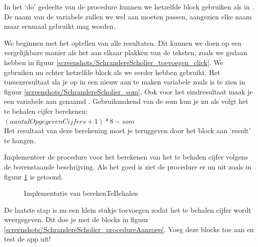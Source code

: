 In het `do' gedeelte van de procedure kunnen we hetzelfde  block gebruiken als in . De naam van de variabele zullen we wel aan moeten passen, aangezien elke naam maar eenmaal gebruikt mag worden. 

We beginnen met het optellen van alle resultaten. Dit kunnen we doen op een vergelijkbare manier als het aan elkaar plakken van de teksten, zoals we gedaan hebben in figuur \ref{screenshots/SchrandereScholier_toevoegen_click}. We gebruiken nu echter hetzelfde \block{+} block als we eerder hebben gebruikt. Het tussenresultaat sla je op in een nieuw aan te maken variabele zoals is te zien in figuur \ref{screenshots/SchrandereScholier_som}. Ook voor het eindresultaat maak je een variabele aan genaamd . Gebruikmakend van de som kun je nu als volgt het te behalen cijfer berekenen: \\$(aantalOpgegevenCijfers+1) * 8 - som$ \\Het resultaat van deze berekening moet je teruggeven door het block  aan `result' te hangen.

 \begin{opgave}
    \opgVraag
Implementeer de procedure voor het berekenen van het te behalen cijfer volgens de bovenstaande beschrijving.
    \opgUitwerking
    Als het goed is ziet de procedure er nu uit zoals in figuur \ref{screenshots/SchrandereScholier_berekenTeBehalen} is getoond.
\end{opgave}

\begin{figure}
    \caption{\label{screenshots/SchrandereScholier_berekenTeBehalen} Implementatie van berekenTeBehalen}
\end{figure}

De laatste stap is nu een klein stukje toevoegen zodat het te behalen cijfer wordt weergegeven. Dit doe je met de blocks in figuur \ref{screenshots/SchrandereScholier_procedureAanroep}. \runOpTelefoon{} Voeg deze blocks toe aan  en test de app uit!

